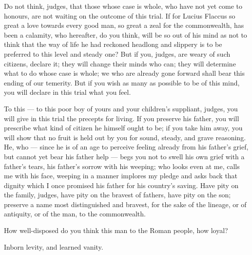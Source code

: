  Do not think, judges, that those whose case is whole, who have not yet come to honours, are not waiting on the outcome of this trial. If for Lucius Flaccus so great a love towards every good man, so great a zeal for the commonwealth, has been a calamity, who hereafter, do you think, will be so out of his mind as not to think that the way of life he had reckoned headlong and slippery is to be preferred to this level and steady one? But if you, judges, are weary of such citizens, declare it; they will change their minds who can; they will determine what to do whose case is whole; we who are already gone forward shall bear this ending of our temerity. But if you wish as many as possible to be of this mind, you will declare in this trial what you feel.

 To this --- to this poor boy of yours and your children's suppliant, judges, you will give in this trial the precepts for living. If you preserve his father, you will prescribe what kind of citizen he himself ought to be; if you take him away, you will show that no fruit is held out by you for sound, steady, and grave reasoning. He, who --- since he is of an age to perceive feeling already from his father's grief, but cannot yet bear his father help --- begs you not to swell his own grief with a father's tears, his father's sorrow with his weeping; who looks even at me, calls me with his face, weeping in a manner implores my pledge and asks back that dignity which I once promised his father for his country's saving. Have pity on the family, judges, have pity on the bravest of fathers, have pity on the son; preserve a name most distinguished and bravest, for the sake of the lineage, or of antiquity, or of the man, to the commonwealth.

 How well-disposed do you think this man to the Roman people, how loyal?

 Inborn levity, and learned vanity.
